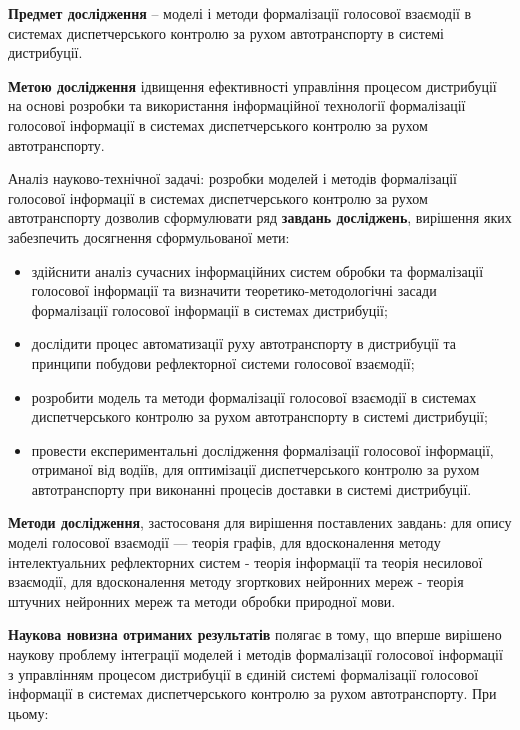 \textbf{Предмет дослідження} – моделі і методи формалізації голосової взаємодії в системах диспетчерського контролю за рухом автотранспорту в системі дистрибуції.

\textbf{Метою дослідження} ідвищення ефективності управління процесом дистрибуції на основі розробки та використання інформаційної технології формалізації голосової інформації в системах диспетчерського контролю за рухом автотранспорту.

Аналіз науково-технічної задачі: розробки моделей і методів формалізації голосової інформації в системах диспетчерського контролю за рухом автотранспорту дозволив сформулювати ряд \textbf{завдань досліджень}, вирішення яких забезпечить досягнення сформульованої мети:

\begin{itemize}
	\item здійснити аналіз сучасних інформаційних систем обробки та формалізації голосової інформації та визначити теоретико-методологічні засади формалізації голосової інформації в системах дистрибуції;
	\item дослідити процес автоматизації руху автотранспорту в дистрибуції та принципи побудови рефлекторної системи голосової взаємодії;
	\item розробити модель та методи формалізації голосової взаємодії в системах диспетчерського контролю за рухом автотранспорту в системі дистрибуції;
	\item провести експериментальні дослідження формалізації голосової інформації, отриманої від водіїв, для оптимізації диспетчерського контролю за рухом автотранспорту при виконанні процесів доставки в системі дистрибуції.
\end{itemize}

\textbf{Методи дослідження}, застосованя для вирішення поставлених завдань: для опису моделі голосової взаємодії — теорія графів, для вдосконалення методу інтелектуальних рефлекторних систем - теорія інформації та теорія несилової взаємодії, для вдосконалення методу згорткових нейронних мереж - теорія штучних нейронних мереж та методи обробки природної мови.

\textbf{Наукова новизна отриманих результатів} полягає в тому, що вперше вирішено наукову проблему інтеграції моделей і методів формалізації голосової інформації з управлінням процесом дистрибуції в єдиній системі формалізації голосової інформації в системах диспетчерського контролю за рухом автотранспорту. При цьому:

